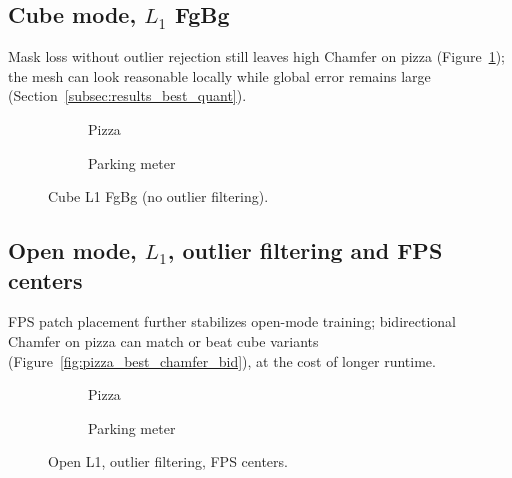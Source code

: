 \documentclass{report}
\begin{document}
\subsection{Cube mode, $L_1$ FgBg}
\label{subsec:ablation_cube_l1_fgbg}

Mask loss without outlier rejection still leaves high Chamfer on pizza (Figure~\ref{fig:ablation_cube_l1_fgbg_pizza}); the mesh can look reasonable locally while global error remains large (Section~\ref{subsec:results_best_quant}).

\begin{figure}[H]
    \centering
    \begin{subfigure}{\textwidth}
        \centering
        \caption{Pizza}
        \label{fig:ablation_cube_l1_fgbg_pizza}
    \end{subfigure}
    \vspace{0.6em}
    \begin{subfigure}{\textwidth}
        \centering
        \caption{Parking meter}
        \label{fig:ablation_cube_l1_fgbg_parking}
    \end{subfigure}
    \caption{Cube L1 FgBg (no outlier filtering).}
    \label{fig:ablation_cube_l1_fgbg}
\end{figure}

\subsection{Open mode, $L_1$, outlier filtering and FPS centers}
\label{subsec:ablation_open_l1_outliers_fps}

FPS patch placement further stabilizes open-mode training; bidirectional Chamfer on pizza can match or beat cube variants (Figure~\ref{fig:pizza_best_chamfer_bid}), at the cost of longer runtime.

\begin{figure}[H]
    \centering
    \begin{subfigure}{\textwidth}
        \centering
        \caption{Pizza}
        \label{fig:ablation_open_l1_out_fps_pizza}
    \end{subfigure}
    \vspace{0.6em}
    \begin{subfigure}{\textwidth}
        \centering
        \caption{Parking meter}
        \label{fig:ablation_open_l1_out_fps_parking}
    \end{subfigure}
    \caption{Open L1, outlier filtering, FPS centers.}
    \label{fig:ablation_open_l1_out_fps}
\end{figure}
\end{document}
